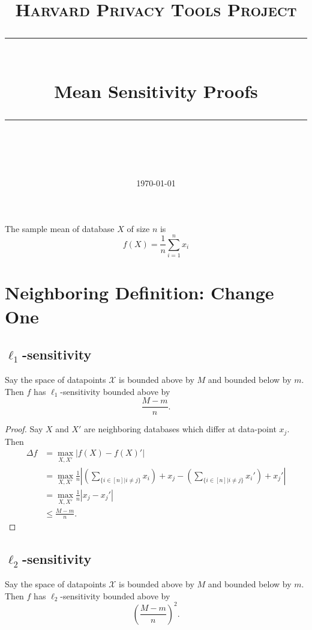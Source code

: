 \documentclass[11pt]{scrartcl} %
\title{
	\normalfont\normalsize
	\textsc{Harvard Privacy Tools Project}\\ %
	\vspace{25pt} %
	\rule{\linewidth}{0.5pt}\\ %
	\vspace{20pt} %
	{\huge Mean Sensitivity Proofs}\\ %
	\vspace{12pt} %
	\rule{\linewidth}{2pt}\\ %
	\vspace{12pt} %
}
\date{\normalsize\today} %
\begin{document}
\maketitle

\begin{definition}
The sample mean of database $X$ of size $n$ is
$$f(X) = \frac{1}{n} \sum_{i=1}^n x_i $$
\end{definition}

\section{Neighboring Definition: Change One}

\subsection{$\ell_1$-sensitivity}
\begin{theorem}
Say the space of datapoints $\mathcal{X}$ is bounded above by $M$ and bounded below by $m$. Then $f$ has $\ell_1$-sensitivity bounded above by
$$ \frac{M-m}{n}.$$
\end{theorem}

\begin{proof}
Say $X$ and $X'$ are neighboring databases which differ at data-point $x_j$. Then
\begin{align*}
\Delta{f} &= \max_{X,X'} \left\vert f(X) - f(X)' \right\vert \\
	&=  \max_{X,X'} \frac{1}{n} \left\vert \left(\sum_{\{ i \in [n] \vert i \ne j\}} x_i\right) + x_j  - \left(\sum_{\{ i \in [n] \vert i \ne j\}} x_i'\right) + x_j'  \right\vert \\
	&= \max_{X,X'} \frac{1}{n} \left\vert x_j - x_j' \right\vert \\
	&\le \frac{M-m}{n}.
\end{align*}
\end{proof}

\subsection{$\ell_2$-sensitivity}
\begin{theorem}
	Say the space of datapoints $\mathcal{X}$ is bounded above by $M$ and bounded below by $m$.
	Then $f$ has $\ell_2$-sensitivity bounded above by
	 $$ \left(\frac{M-m}{n}\right)^2. $$
\end{theorem}
\end{document}
